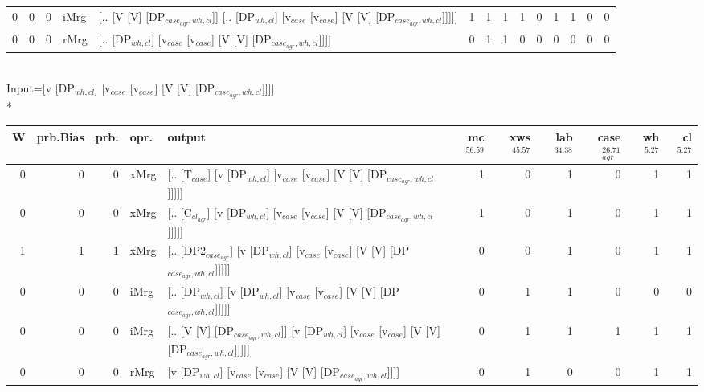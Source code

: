 \begin{tabularx}{\linewidth}{rrrlXrrrrrrrrr}
   0 &       0 &   0 & iMrg & [.. [V [V] [DP$_{case_{agr},wh,cl}$]] [.. [DP$_{wh,cl}$] [v$_{case}$ [v$_{case}$] [V [V] [DP$_{case_{agr},wh,cl}$]]]]]                   &            1 &             1 &             1 &                  1 &              0 &           1 &           1 &                0 &             0 \\
   0 &       0 &   0 & rMrg & [.. [DP$_{wh,cl}$] [v$_{case}$ [v$_{case}$] [V [V] [DP$_{case_{agr},wh,cl}$]]]]                                                    &            0 &             1 &             1 &                  0 &              0 &           0 &           0 &                0 &             0 \\
\hline
\end{tabularx}\endgroup\\
\begingroup\scriptsize Input=[v [DP$_{wh,cl}$] [v$_{case}$ [v$_{case}$] [V [V] [DP$_{case_{agr},wh,cl}$]]]]\\*
\begin{tabularx}{\linewidth}{rrrlXrrrrrr}
\hline
   W &   prb.Bias &   prb. & opr.   & output                                                                                        &   mc$^{56.59}$ &   xws$^{45.57}$ &   lab$^{34.38}$ &   case$_{agr}^{26.71}$ &   wh$^{5.27}$ &   cl$^{5.27}$ \\
\hline
   0 &       0 &   0 & xMrg & [.. [T$_{case}$] [v [DP$_{wh,cl}$] [v$_{case}$ [v$_{case}$] [V [V] [DP$_{case_{agr},wh,cl}$]]]]]                    &            1 &             0 &             1 &                  0 &           1 &           1 \\
   0 &       0 &   0 & xMrg & [.. [C$_{cl_{agr}}$] [v [DP$_{wh,cl}$] [v$_{case}$ [v$_{case}$] [V [V] [DP$_{case_{agr},wh,cl}$]]]]]                  &            1 &             0 &             1 &                  0 &           1 &           1 \\
   1 &       1 &   1 & xMrg & [.. [DP2$_{case_{agr}}$] [v [DP$_{wh,cl}$] [v$_{case}$ [v$_{case}$] [V [V] [DP$_{case_{agr},wh,cl}$]]]]]              &            0 &             0 &             1 &                  0 &           1 &           1 \\
   0 &       0 &   0 & iMrg & [.. [DP$_{wh,cl}$] [v [DP$_{wh,cl}$] [v$_{case}$ [v$_{case}$] [V [V] [DP$_{case_{agr},wh,cl}$]]]]]                  &            0 &             1 &             1 &                  0 &           0 &           0 \\
   0 &       0 &   0 & iMrg & [.. [V [V] [DP$_{case_{agr},wh,cl}$]] [v [DP$_{wh,cl}$] [v$_{case}$ [v$_{case}$] [V [V] [DP$_{case_{agr},wh,cl}$]]]]] &            0 &             1 &             1 &                  1 &           1 &           1 \\
   0 &       0 &   0 & rMrg & [v [DP$_{wh,cl}$] [v$_{case}$ [v$_{case}$] [V [V] [DP$_{case_{agr},wh,cl}$]]]]                                  &            0 &             1 &             0 &                  0 &           1 &           1 \\
\hline
\end{tabularx}\endgroup\\
